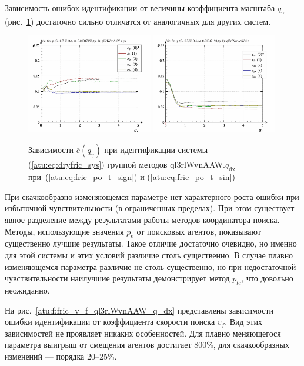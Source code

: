 Зависимость ошибок идентификации от величины коэффициента масштаба
$q_\gamma$
(рис.~\ref{atu:f:fric_q_gamma_ql3rlWvnAAW_q_dx})
достаточно сильно отличатся от аналогичных для других систем.

\begin{figure}[htb!]
  \centerline{
    \includegraphics[width=0.49\textwidth]{p/cha/fric/ql3rlWvnAAW/fric_id-p_q_gamma_sign.png}
    \hfill
    \includegraphics[width=0.49\textwidth]{p/cha/fric/ql3rlWvnAAW/fric_id-p_q_gamma_sin.png}
  }
  \caption{Зависимости $\overline{e}(q_\gamma)$ при идентификации системы (\ref{atu:eq:dryfric_sys}) группой методов ql3rlWvnAAW.$q_\mathrm{dx}$
   при~(\ref{atu:eq:fric_po_t_sign}) и (\ref{atu:eq:fric_po_t_sin})}
  \label{atu:f:fric_q_gamma_ql3rlWvnAAW_q_dx}
\end{figure}

При скачкообразно изменяющемся параметре
нет характерного роста ошибки при избыточной чувствительности
(в ограниченных пределах). При этом существует явное разделение между
результатами работы методов координатора поиска.
Методы, использующие значения $p_e$ от поисковых
агентов, показывают существенно лучшие результаты.
Такое отличие достаточно очевидно, но именно для этой системы
и этих условий
различие столь существенно.
В случае плавно изменяющемся параметра различие не столь существенно,
но при недостаточной чувствительности наилучшие результаты демонстрирует метод $p_{lc}$,
что довольно неожиданно.


На рис.~\ref{atu:f:fric_v_f_ql3rlWvnAAW_q_dx} представлены зависимости ошибки идентификации
от коэффициента скорости поиска $v_f$.
Вид этих зависимостей не проявляет никаких особенностей.
Для плавно меняющегося параметра выигрыш от смещения агентов достигает 800\%,
для скачкообразных изменений --- порядка 20--25\%.

